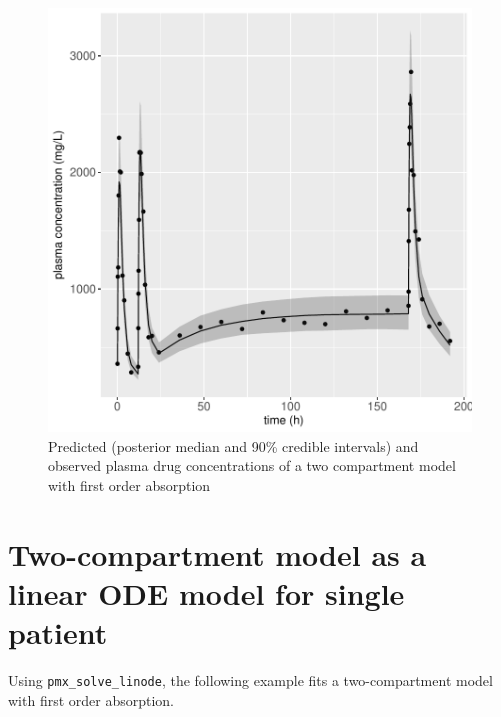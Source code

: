 \documentclass[10pt, reqno, oneside]{amsbook}
\numberwithin{equation}{chapter}
\numberwithin{figure}{chapter}
\numberwithin{table}{chapter}
\theoremstyle{remark}
\begin{document}
\begin{figure}[htbp]
\centering
\includegraphics[width=0.5\linewidth]{../example-models/R/deliv/figure/TwoCptModel/TwoCptModelPlots006.pdf}
\caption{\label{twocpt_mcmc_predict}
Predicted (posterior median and 90\% credible intervals) and observed plasma drug concentrations of a two compartment model with first order absorption}
\end{figure}

\section{Two-compartment model as a linear ODE model for single patient}
\label{sec:orge8b493b}
Using \texttt{pmx\_solve\_linode}, the following example fits a two-compartment model
with first order absorption.
\end{document}
